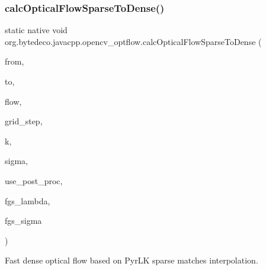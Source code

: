 \subsubsection{\texorpdfstring{calc\+Optical\+Flow\+Sparse\+To\+Dense()}{calcOpticalFlowSparseToDense()}}
{\footnotesize\ttfamily static native void org.\+bytedeco.\+javacpp.\+opencv\+\_\+optflow.\+calc\+Optical\+Flow\+Sparse\+To\+Dense (\begin{DoxyParamCaption}\item[{@By\+Val Mat}]{from,  }\item[{@By\+Val Mat}]{to,  }\item[{@By\+Val Mat}]{flow,  }\item[{int}]{grid\+\_\+step,  }\item[{int}]{k,  }\item[{float}]{sigma,  }\item[{@Cast(\char`\"{}bool\char`\"{}) boolean}]{use\+\_\+post\+\_\+proc,  }\item[{float}]{fgs\+\_\+lambda,  }\item[{float}]{fgs\+\_\+sigma }\end{DoxyParamCaption})\hspace{0.3cm}{\ttfamily [static]}}



Fast dense optical flow based on Pyr\+LK sparse matches interpolation. 


